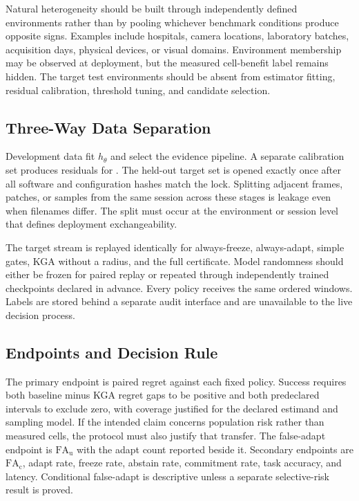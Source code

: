 Natural heterogeneity should be built through independently defined environments rather than by
pooling whichever benchmark conditions produce opposite signs. Examples include hospitals, camera
locations, laboratory batches, acquisition days, physical devices, or visual domains. Environment
membership may be observed at deployment, but the measured cell-benefit label remains hidden. The target
test environments should be absent from estimator fitting, residual calibration, threshold tuning,
and candidate selection.

\subsection{Three-Way Data Separation}

Development data fit $h_\theta$ and select the evidence pipeline. A separate calibration set
produces residuals for . The held-out target set is opened exactly once
after all software and configuration hashes match the lock. Splitting adjacent frames, patches, or
samples from the same session across these stages is leakage even when filenames differ. The split
must occur at the environment or session level that defines deployment exchangeability.

The target stream is replayed identically for always-freeze, always-adapt, simple gates, KGA without
a radius, and the full certificate. Model randomness should either be frozen for paired replay or
repeated through independently trained checkpoints declared in advance. Every policy receives the
same ordered windows. Labels are stored behind a separate audit interface and are unavailable to
the live decision process.

\subsection{Endpoints and Decision Rule}

The primary endpoint is paired regret against each fixed policy. Success requires both baseline
minus KGA regret gaps to be positive and both predeclared intervals to exclude zero, with coverage
justified for the declared estimand and sampling model. If the intended claim concerns population
risk rather than measured cells, the protocol must also justify that transfer. The false-adapt
endpoint is $\mathrm{FA}_{\mathrm u}$ with the adapt count
reported beside it. Secondary endpoints are $\mathrm{FA}_{\mathrm c}$, adapt rate, freeze rate,
abstain rate, commitment rate, task accuracy, and latency. Conditional false-adapt is descriptive
unless a separate selective-risk result is proved.

